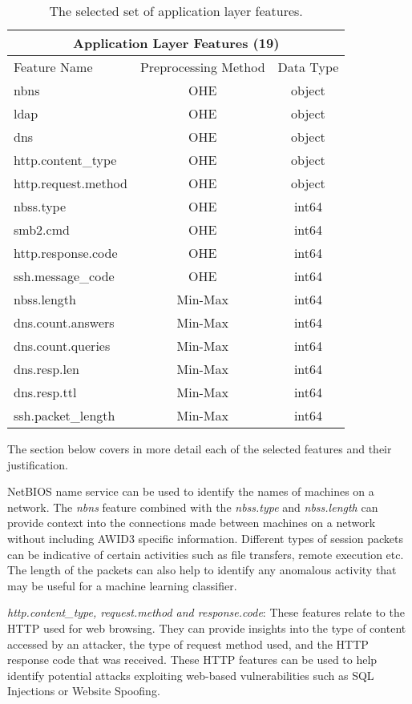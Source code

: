 \begin{table}[H]
\centering
\begin{tabular}{lcc}
\hline
\multicolumn{3}{c}{\textbf{Application Layer Features (19)}} \\ \hline
Feature Name & Preprocessing Method & Data Type \\ \hline
nbns & OHE & object \\
ldap & OHE & object \\
dns & OHE & object \\
http.content\_type & OHE & object \\
http.request.method & OHE & object \\
nbss.type & OHE & int64 \\
smb2.cmd & OHE & int64 \\
http.response.code & OHE & int64 \\
ssh.message\_code & OHE & int64 \\
nbss.length & Min-Max & int64 \\
dns.count.answers & Min-Max & int64 \\
dns.count.queries & Min-Max & int64 \\
dns.resp.len & Min-Max & int64 \\
dns.resp.ttl & Min-Max & int64 \\
ssh.packet\_length & Min-Max & int64 \\ \hline
\end{tabular}
\caption{The selected set of application layer features.}
\label{tab:application_features}
\end{table}

The section below covers in more detail each of the selected features and their justification.

NetBIOS name service can be used to identify the names of machines on a network. The \textit{nbns} feature combined with the \textit{nbss.type} and \textit{nbss.length} can provide context into the connections made between machines on a network without including AWID3 specific information. Different types of session packets can be indicative of certain activities such as file transfers, remote execution etc. The length of the packets can also help to identify any anomalous activity that may be useful for a machine learning classifier. 

\medskip
\textit{http.content\_type, request.method and response.code}: These features relate to the HTTP used for web browsing. They can provide insights into the type of content accessed by an attacker, the type of request method used, and the HTTP response code that was received. These HTTP features can be used to help identify potential attacks exploiting web-based vulnerabilities such as SQL Injections or Website Spoofing.

